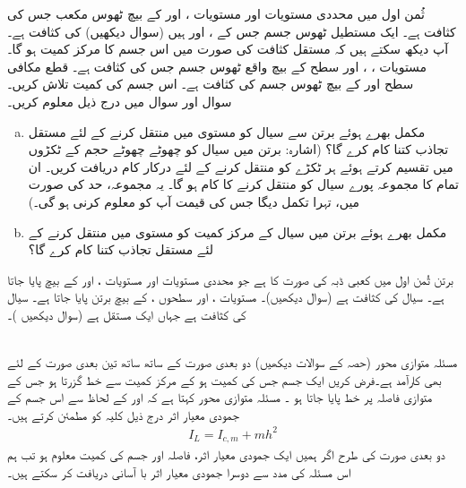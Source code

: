 ثُمن اول میں محددی مستویات اور مستویات ،   اور   کے بیچ ٹھوس مکعب  جس کی کثافت  ہے۔
ایک مستطیل ٹھوس جسم جس کے ،  اور  ہیں (سوال  دیکھیں)  کی کثافت  ہے۔ آپ دیکھ سکتے ہیں کہ مستقل کثافت کی صورت میں اس جسم کا مرکز  کمیت  ہو گا۔
مستویات ، ،  اور سطح  کے بیچ واقع ٹھوس جسم جس کی کثافت  ہے۔
قطع مکافی سطح   اور  کے بیچ ٹھوس جسم کی کثافت  ہے۔ اس جسم کی کمیت تلاش کریں۔
\\
سوال  اور  سوال  میں درج ذیل معلوم کریں۔
\begin{enumerate}[a.]
\item
    مکمل بھرے ہوئے برتن سے   سیال  کو مستوی  میں منتقل کرنے کے لئے مستقل  تجاذب    کتنا  کام کرے گا؟   (اشارہ: برتن میں سیال  کو چھوٹے چھوٹے حجم کے ٹکڑوں   میں تقسیم کرتے ہوئے  ہر ٹکڑے کو منتقل کرنے کے لئے درکار کام دریافت کریں۔ ان تمام کا مجموعہ پورے سیال کو منتقل کرنے کا کام ہو گا۔ یہ مجموعہ، حد کی صورت میں، تہرا تکمل دیگا جس کی قیمت آپ کو معلوم کرنی ہو گی۔)
\item
مکمل بھرے ہوئے برتن میں  سیال کے مرکز کمیت کو مستوی  میں منتقل کرنے کے لئے مستقل تجاذب  کتنا کام کرے گا؟
\end{enumerate}

برتن ثُمن اول میں کعبی ڈبہ کی صورت کا ہے جو محددی مستویات اور مستویات ،  اور  کے بیچ پایا جاتا ہے۔ سیال کی کثافت  ہے (سوال  دیکھیں)۔
مستویات ،  اور سطحوں ،  کے بیچ برتن پایا جاتا ہے۔ سیال کی کثافت  ہے جہاں  ایک مستقل ہے (سوال  دیکھیں )۔

\\
مسئلہ متوازی محور (حصہ  کے سوالات دیکھیں)   دو بعدی صورت  کے ساتھ ساتھ تین بعدی صورت  کے لئے بھی کارآمد ہے۔فرض کریں ایک جسم جس کی کمیت  ہو کے مرکز کمیت سے خط  گزرتا ہو  جس کے متوازی   فاصلہ پر خط  پایا جاتا ہو ۔ مسئلہ متوازی محور کہتا ہے کہ  اور  کے لحاظ سے اس جسم کے جمودی معیار اثر درج ذیل کلیہ کو مطمئن کرتے ہیں۔
\begin{align}\label{مساوات_بالکثرت_مسئلہ_متوازی_محور_الف}
I_L=I_{c,m}+mh^2
\end{align}
دو بعدی  صورت کی طرح اگر ہمیں ایک جمودی معیار اثر، فاصلہ  اور جسم کی کمیت  معلوم ہو تب   ہم اس  مسئلہ کی  مدد سے  دوسرا جمودی معیار اثر با آسانی  دریافت کر سکتے ہیں۔


